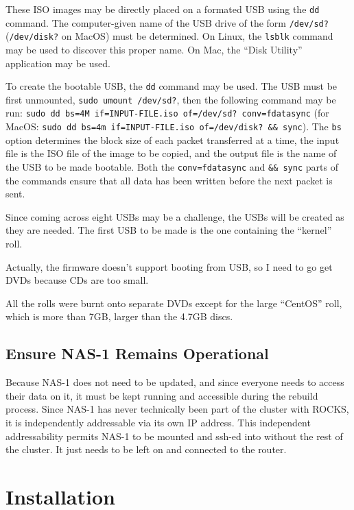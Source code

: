 \documentclass[12pt]{article}
\begin{document}
\qq These ISO images may be directly placed on a formated USB using the {\tt dd}
command. The computer-given name of the USB drive of the form
{\tt /dev/sd?} ({\tt /dev/disk?} on MacOS) must be determined. On Linux, the
{\tt lsblk} command may be used to discover this proper name. On Mac, the ``Disk
Utility'' application may be used.

\qq To create the bootable USB, the {\tt dd} command may be used. The USB must be
first unmounted, {\tt sudo umount /dev/sd?}, then the following command may be
run: {\tt sudo dd bs=4M if=INPUT-FILE.iso of=/dev/sd? conv=fdatasync} (for MacOS:
{\tt sudo dd bs=4m if=INPUT-FILE.iso of=/dev/disk? \&\& sync}). The {\tt bs}
option determines the block size of each packet transferred at a time, the input
file is the ISO file of the image to be copied, and the output file is the name of
the USB to be made bootable. Both the {\tt conv=fdatasync} and {\tt \&\& sync}
parts of the commands ensure that all data has been written before the next
packet is sent.

\qq Since coming across eight USBs may be a challenge, the USBs will be created
as they are needed. The first USB to be made is the one containing the
``kernel'' roll.

\qq Actually, the firmware doesn't support booting from USB, so I need to go
get DVDs because CDs are too small.

\qq All the rolls were burnt onto separate DVDs except for the large ``CentOS''
roll, which is more than 7GB, larger than the 4.7GB discs.


\subsection{Ensure NAS-1 Remains Operational}

\qq Because NAS-1 does not need to be updated, and since everyone needs to
access their data on it, it must be kept running and accessible during the
rebuild process. Since NAS-1 has never technically been part of the cluster with
ROCKS, it is independently addressable via its own IP address. This independent
addressability permits NAS-1 to be mounted and ssh-ed into without the rest of
the cluster. It just needs to be left on and connected to the router.



\section{Installation}
\end{document}
